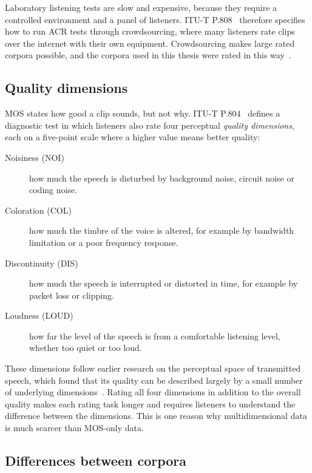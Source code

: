 \documentclass[
english,                 %
bibtex,                  %
includeExtraAbstracts, %
]{kththesis}
\numberwithin{listing}{chapter}
\begin{document}
Laboratory listening tests are slow and expensive, because they require a controlled environment and a panel of listeners. ITU-T P.808~\cite{itu_p808} therefore specifies how to run ACR tests through crowdsourcing, where many listeners rate clips over the internet with their own equipment. Crowdsourcing makes large rated corpora possible, and the corpora used in this thesis were rated in this way~\cite{mittag_nisqa_2021,mittag_pstn_2020}.

\subsection{Quality dimensions}
\label{sec:qualityDimensions}

MOS states how good a clip sounds, but not why. ITU-T P.804~\cite{itu_p804} defines a diagnostic test in which listeners also rate four perceptual \emph{quality dimensions}, each on a five-point scale where a higher value means better quality:
\begin{description}
\item[Noisiness (NOI)] how much the speech is disturbed by background noise, circuit noise or coding noise.
\item[Coloration (COL)] how much the timbre of the voice is altered, for example by bandwidth limitation or a poor frequency response.
\item[Discontinuity (DIS)] how much the speech is interrupted or distorted in time, for example by packet loss or clipping.
\item[Loudness (LOUD)] how far the level of the speech is from a comfortable listening level, whether too quiet or too loud.
\end{description}
These dimensions follow earlier research on the perceptual space of transmitted speech, which found that its quality can be described largely by a small number of underlying dimensions~\cite{waltermann_2010}. Rating all four dimensions in addition to the overall quality makes each rating task longer and requires listeners to understand the difference between the dimensions. This is one reason why multidimensional data is much scarcer than MOS-only data.

\subsection{Differences between corpora}
\label{sec:corpusEffects}
\end{document}
